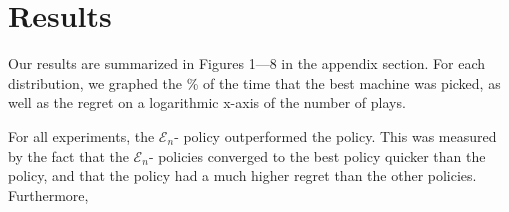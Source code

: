 
\section{Results}
\label{sec:results}

Our results are summarized in Figures 1---8 in the appendix
section. For each distribution, we graphed the \% of the time that the
best machine was picked, as well as the regret on a logarithmic x-axis
of the number of plays.

For all experiments, the $\mathcal{E}_n$- policy
outperformed the  policy. This was measured by the fact
that the $\mathcal{E}_n$- policies converged to the
best policy quicker than the  policy, and that the
 policy had a much higher regret than the other
policies. Furthermore, 
